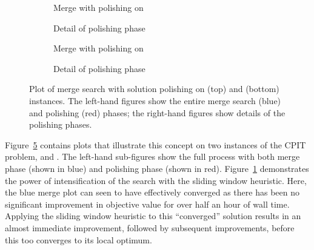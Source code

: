 \documentclass[journal]{IEEEtran}
\begin{document}
\begin{figure}[t!]
    \centering
    \begin{subfigure}[t]{0.23\textwidth}
    \centering
    \vspace*{-5mm}\caption{Merge with polishing on \zuckmed{}}
    \label{plot:polish.med1}
    \end{subfigure}
    \quad
    \begin{subfigure}[t]{0.23\textwidth}
    \centering
    \caption{Detail of polishing phase}
    \label{plot:polish.med2}
    \end{subfigure}
    \quad
    \centering
    \begin{subfigure}[t]{0.23\textwidth}
    \centering
    \vspace*{-5mm}\caption{Merge with polishing on \zucklarge{}}
    \label{plot:polish.large1}
    \end{subfigure}
    \quad
    \begin{subfigure}[t]{0.23\textwidth}
    \centering
    \vspace*{-5mm}\caption{Detail of polishing phase}
    \label{plot:polish.large2}
    \end{subfigure}
    \caption[Plot of merge search with solution polishing on \zuckmed{} and \zucklarge{} instances]{Plot of merge search with solution polishing on \zuckmed{} (top) and \zucklarge{} (bottom) instances. The left-hand figures show the entire merge search (blue) and polishing (red) phases; the right-hand figures show details of the polishing phases.}
    \label{plot:mine:polish}
\end{figure}

Figure~\ref{plot:mine:polish} contains plots that illustrate this concept on two instances of the CPIT problem, \zuckmed{} and \zucklarge{}. The left-hand sub-figures show the full process with both merge phase (shown in blue) and polishing phase (shown in red). Figure~\ref{plot:polish.med1} demonstrates the power of intensification of the search with the sliding window heuristic. Here, the blue merge plot can seen to have effectively converged as there has been no significant improvement in objective value for over half an hour of wall time. Applying the sliding window heuristic to this ``converged'' solution results in an almost immediate improvement, followed by subsequent improvements, before this too converges to its local optimum.
\end{document}
